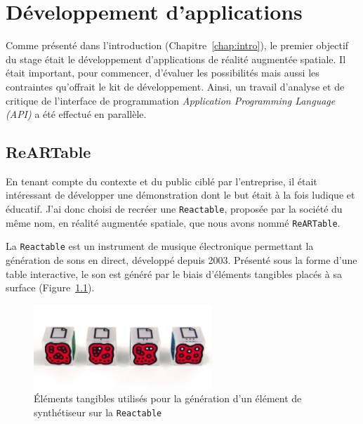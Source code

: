 \chapter{Développement d'applications}
\label{chap:app}

Comme présenté dans l'introduction (Chapitre~\ref{chap:intro}), le premier objectif du stage était le développement d'applications de réalité augmentée spatiale. Il était important, pour commencer, d'évaluer les possibilités mais aussi les contraintes qu'offrait le kit de développement. 
Ainsi, un travail d'analyse et de critique de l'interface de programmation \emph{Application Programming Language (API)} a été effectué en parallèle.

\section{ReARTable}
\label{sec:reartable}
En tenant compte du contexte et du public ciblé par l'entreprise, il était intéressant de développer une démonstration dont le but était à la fois ludique et éducatif. J'ai donc choisi de recréer une \texttt{Reactable}\cite{reactable}, proposée par la société du même nom, en réalité augmentée spatiale, que nous avons nommé \texttt{ReARTable}.

La \texttt{Reactable} est un instrument de musique électronique permettant la génération de sons en direct, développé depuis 2003. Présenté sous la forme d'une table interactive, le son est généré par le biais d'éléments tangibles placés à sa surface (Figure~\ref{fig:reactelem}). 

\begin{figure}[H]
\centering
\includegraphics[width=0.6\textwidth]{images/reactelements}
\caption{Éléments tangibles utilisés pour la génération d'un élément de synthétiseur sur la \texttt{Reactable}\protect\footnotemark}
\label{fig:reactelem}
\end{figure}


